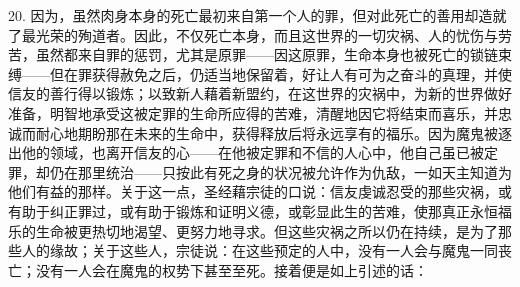 20. 因为，虽然肉身本身的死亡最初来自第一个人的罪，但对此死亡的善用却造就了最光荣的殉道者。因此，不仅死亡本身，而且这世界的一切灾祸、人的忧伤与劳苦，虽然都来自罪的惩罚，尤其是原罪——因这原罪，生命本身也被死亡的锁链束缚——但在罪获得赦免之后，仍适当地保留着，好让人有可为之奋斗的真理，并使信友的善行得以锻炼；以致新人藉着新盟约，在这世界的灾祸中，为新的世界做好准备，明智地承受这被定罪的生命所应得的苦难，清醒地因它将结束而喜乐，并忠诚而耐心地期盼那在未来的生命中，获得释放后将永远享有的福乐。因为魔鬼被逐出他的领域，也离开信友的心——在他被定罪和不信的人心中，他自己虽已被定罪，却仍在那里统治——只按此有死之身的状况被允许作为仇敌，一如天主知道为他们有益的那样。关于这一点，圣经藉宗徒的口说：信友虔诚忍受的那些灾祸，或有助于纠正罪过，或有助于锻炼和证明义德，或彰显此生的苦难，使那真正永恒福乐的生命被更热切地渴望、更努力地寻求。但这些灾祸之所以仍在持续，是为了那些人的缘故；关于这些人，宗徒说：在这些预定的人中，没有一人会与魔鬼一同丧亡；没有一人会在魔鬼的权势下甚至至死。接着便是如上引述的话：\par

